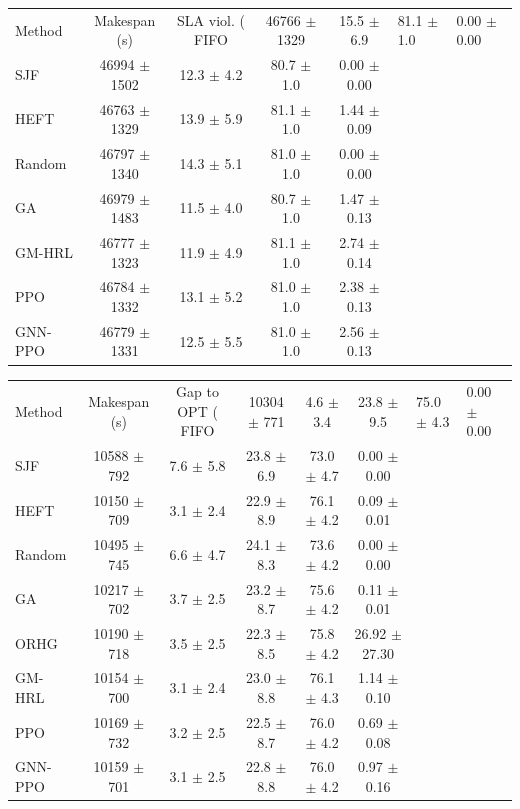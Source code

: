 \begin{tabular}{lcccc}
\toprule
Method & Makespan (s) & SLA viol. (%
\midrule
FIFO & 46766 $\pm$ 1329 & 15.5 $\pm$ 6.9 & 81.1 $\pm$ 1.0 & 0.00 $\pm$ 0.00 \\
SJF & 46994 $\pm$ 1502 & 12.3 $\pm$ 4.2 & 80.7 $\pm$ 1.0 & 0.00 $\pm$ 0.00 \\
HEFT & 46763 $\pm$ 1329 & 13.9 $\pm$ 5.9 & 81.1 $\pm$ 1.0 & 1.44 $\pm$ 0.09 \\
Random & 46797 $\pm$ 1340 & 14.3 $\pm$ 5.1 & 81.0 $\pm$ 1.0 & 0.00 $\pm$ 0.00 \\
GA & 46979 $\pm$ 1483 & 11.5 $\pm$ 4.0 & 80.7 $\pm$ 1.0 & 1.47 $\pm$ 0.13 \\
GM-HRL & 46777 $\pm$ 1323 & 11.9 $\pm$ 4.9 & 81.1 $\pm$ 1.0 & 2.74 $\pm$ 0.14 \\
PPO & 46784 $\pm$ 1332 & 13.1 $\pm$ 5.2 & 81.0 $\pm$ 1.0 & 2.38 $\pm$ 0.13 \\
GNN-PPO & 46779 $\pm$ 1331 & 12.5 $\pm$ 5.5 & 81.0 $\pm$ 1.0 & 2.56 $\pm$ 0.13 \\
\bottomrule
\end{tabular}

\begin{tabular}{lccccc}
\toprule
Method & Makespan (s) & Gap to OPT (%
\midrule
FIFO & 10304 $\pm$ 771 & 4.6 $\pm$ 3.4 & 23.8 $\pm$ 9.5 & 75.0 $\pm$ 4.3 & 0.00 $\pm$ 0.00 \\
SJF & 10588 $\pm$ 792 & 7.6 $\pm$ 5.8 & 23.8 $\pm$ 6.9 & 73.0 $\pm$ 4.7 & 0.00 $\pm$ 0.00 \\
HEFT & 10150 $\pm$ 709 & 3.1 $\pm$ 2.4 & 22.9 $\pm$ 8.9 & 76.1 $\pm$ 4.2 & 0.09 $\pm$ 0.01 \\
Random & 10495 $\pm$ 745 & 6.6 $\pm$ 4.7 & 24.1 $\pm$ 8.3 & 73.6 $\pm$ 4.2 & 0.00 $\pm$ 0.00 \\
GA & 10217 $\pm$ 702 & 3.7 $\pm$ 2.5 & 23.2 $\pm$ 8.7 & 75.6 $\pm$ 4.2 & 0.11 $\pm$ 0.01 \\
ORHG & 10190 $\pm$ 718 & 3.5 $\pm$ 2.5 & 22.3 $\pm$ 8.5 & 75.8 $\pm$ 4.2 & 26.92 $\pm$ 27.30 \\
GM-HRL & 10154 $\pm$ 700 & 3.1 $\pm$ 2.4 & 23.0 $\pm$ 8.8 & 76.1 $\pm$ 4.3 & 1.14 $\pm$ 0.10 \\
PPO & 10169 $\pm$ 732 & 3.2 $\pm$ 2.5 & 22.5 $\pm$ 8.7 & 76.0 $\pm$ 4.2 & 0.69 $\pm$ 0.08 \\
GNN-PPO & 10159 $\pm$ 701 & 3.1 $\pm$ 2.5 & 22.8 $\pm$ 8.8 & 76.0 $\pm$ 4.2 & 0.97 $\pm$ 0.16 \\
\bottomrule
\end{tabular}

